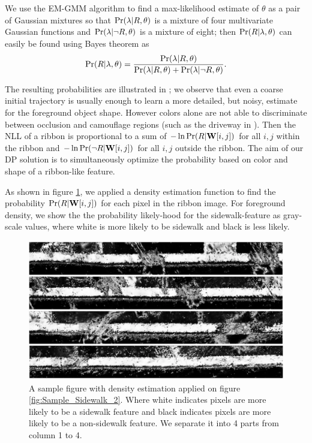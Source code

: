 We use the EM-GMM algorithm to find a max-likelihood estimate of $\theta$ as a pair of Gaussian mixtures so that $\Pr(\lambda{}|R, \theta)$ is a mixture of four multivariate Gaussian functions and $\Pr(\lambda{}|\neg R, \theta)$ is a mixture of eight; then $\Pr(R|\lambda{}, \theta)$ can easily be found using Bayes theorem as 
$$\Pr(R|\lambda{}, \theta)= \frac{\Pr(\lambda{}|R, \theta)}{\Pr(\lambda{}|R, \theta)+\Pr(\lambda{}|\neg R, \theta)}.$$




The resulting probabilities are illustrated in ; we observe that even a
coarse initial trajectory is usually enough to learn a more detailed, but noisy, estimate for the
foreground object shape. However colors alone are not able to discriminate between occlusion and
camouflage regions (such as the driveway in ).
Then the \ac{NLL} of a ribbon is proportional to a sum of $-\ln \Pr(R|\mathbf{W}{}[i,j])$
for all $i,j$ within the ribbon and $-\ln \Pr(\neg R| \mathbf{W}{}[i,j])$ for all $i,j$ outside the ribbon.
 The aim of our
\ac{DP} solution is to simultaneously optimize the probability based on color and shape of a
ribbon-like feature.

As shown in figure \ref{fig:GMM_Sample_2}, we applied a density estimation function to find the probability 
$\Pr(R|\mathbf{W}[i,j])$ for each pixel in the ribbon image. 
For foreground density, we show the the probability likely-hood for 
the sidewalk-feature as gray-scale values, where white is more likely to be sidewalk and black is less likely. 

\begin{figure}[H]
    \centering
    \includegraphics[width=\textwidth]{Figures/GMM_SAMPLE2.png}
    \caption[Density Estimation on Sample Sidewalk]{
    A sample figure with density estimation applied on figure \ref{fig:Sample_Sidewalk_2}. Where
    white indicates pixels are more likely to be a sidewalk feature and black indicates pixels are
    more likely to be a non-sidewalk feature. We separate it into 4 parts from column 1 to 4.}
    \label{fig:GMM_Sample_2}
\end{figure}


